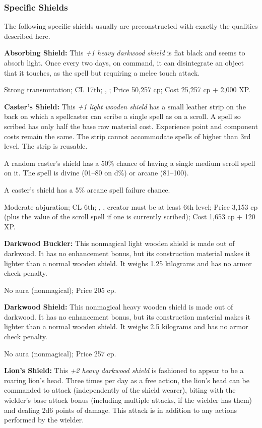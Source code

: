 \subsubsection{Specific Shields}
The following specific shields usually are preconstructed with exactly the qualities described here.

\textbf{Absorbing Shield:} This \emph{+1 heavy darkwood shield} is flat black and seems to absorb light. Once every two days, on command, it can disintegrate an object that it touches, as the spell but requiring a melee touch attack.

Strong transmutation; CL 17th; , ; Price 50,257 cp; Cost 25,257 cp + 2,000 XP.

\textbf{Caster's Shield:} This \emph{+1 light wooden shield} has a small leather strip on the back on which a spellcaster can scribe a single spell as on a scroll. A spell so scribed has only half the base raw material cost. Experience point and component costs remain the same. The strip cannot accommodate spells of higher than 3rd level. The strip is reusable.

A random caster's shield has a 50\% chance of having a single medium scroll spell on it. The spell is divine (01--80 on d\%) or arcane (81--100).

A caster's shield has a 5\% arcane spell failure chance.

Moderate abjuration; CL 6th; , , creator must be at least 6th level; Price 3,153 cp (plus the value of the scroll spell if one is currently scribed); Cost 1,653 cp + 120 XP.

\textbf{Darkwood Buckler:} This nonmagical light wooden shield is made out of darkwood. It has no enhancement bonus, but its construction material makes it lighter than a normal wooden shield. It weighs 1.25 kilograms and has no armor check penalty.

No aura (nonmagical); Price 205 cp.

\textbf{Darkwood Shield:} This nonmagical heavy wooden shield is made out of darkwood. It has no enhancement bonus, but its construction material makes it lighter than a normal wooden shield. It weighs 2.5 kilograms and has no armor check penalty.

No aura (nonmagical); Price 257 cp.

\textbf{Lion's Shield:} This \emph{+2 heavy darkwood shield} is fashioned to appear to be a roaring lion's head. Three times per day as a free action, the lion's head can be commanded to attack (independently of the shield wearer), biting with the wielder's base attack bonus (including multiple attacks, if the wielder has them) and dealing 2d6 points of damage. This attack is in addition to any actions performed by the wielder.

